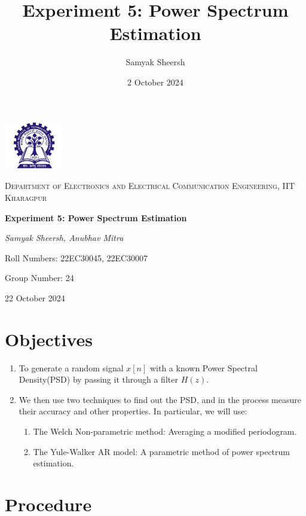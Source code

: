 \documentclass{article}
\title{Experiment 5: Power Spectrum Estimation}
\author{Samyak Sheersh}
\date{2 October 2024}
\begin{document}
\begin{titlepage}
    \centering
    \includegraphics[width=0.2\textwidth]{KGP_logo.png}\par\vspace{1cm}
    {\scshape\LARGE Department of Electronics and Electrical Communication Engineering, IIT Kharagpur\par}
    \vspace{1cm}
    {\huge\bfseries Experiment 5: Power Spectrum Estimation \par}
    \vspace{1.5cm}
    {\Large\itshape Samyak Sheersh, Anubhav Mitra\par}
    \vfill
    {\large Roll Numbers: 22EC30045, 22EC30007\par}
    {\large Group Number: 24\par}
    \vfill
    {\large 22 October 2024\par}
\end{titlepage}

\section{Objectives}
\begin{enumerate}
  \item To generate a random signal $x[n]$ with a known Power Spectral Density(PSD) by passing it through a filter $H(z)$.
  \item We then use two techniques to find out the PSD, and in the process measure their accuracy and other properties. In particular, we will use:

    \begin{enumerate}
      \item The Welch Non-parametric method: Averaging a modified periodogram.
      \item The Yule-Walker AR model: A parametric method of power spectrum estimation. 
    \end{enumerate}
\end{enumerate}
\section{Procedure}
\end{document}
